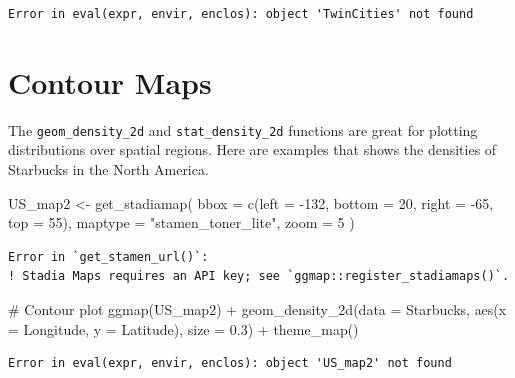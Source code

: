 \documentclass[
  letterpaper,
  DIV=11,
  numbers=noendperiod]{scrreprt}
\newenvironment{Shaded}{\begin{snugshade}}{\end{snugshade}}
\newcommand{\AttributeTok}[1]{\textcolor[rgb]{0.40,0.45,0.13}{#1}}
\newcommand{\CommentTok}[1]{\textcolor[rgb]{0.37,0.37,0.37}{#1}}
\newcommand{\DecValTok}[1]{\textcolor[rgb]{0.68,0.00,0.00}{#1}}
\newcommand{\FloatTok}[1]{\textcolor[rgb]{0.68,0.00,0.00}{#1}}
\newcommand{\FunctionTok}[1]{\textcolor[rgb]{0.28,0.35,0.67}{#1}}
\newcommand{\NormalTok}[1]{\textcolor[rgb]{0.00,0.23,0.31}{#1}}
\newcommand{\OtherTok}[1]{\textcolor[rgb]{0.00,0.23,0.31}{#1}}
\newcommand{\SpecialCharTok}[1]{\textcolor[rgb]{0.37,0.37,0.37}{#1}}
\newcommand{\StringTok}[1]{\textcolor[rgb]{0.13,0.47,0.30}{#1}}
\begin{document}
\begin{verbatim}
Error in eval(expr, envir, enclos): object 'TwinCities' not found
\end{verbatim}

\hfill\break

\section*{Contour Maps}\label{contour-maps}


The \texttt{geom\_density\_2d} and \texttt{stat\_density\_2d} functions
are great for plotting distributions over spatial regions. Here are
examples that shows the densities of Starbucks in the North America.

\begin{Shaded}
\begin{Highlighting}[]
\NormalTok{US\_map2 }\OtherTok{\textless{}{-}} \FunctionTok{get\_stadiamap}\NormalTok{(}
  \AttributeTok{bbox =} \FunctionTok{c}\NormalTok{(}\AttributeTok{left =} \SpecialCharTok{{-}}\DecValTok{132}\NormalTok{, }\AttributeTok{bottom =} \DecValTok{20}\NormalTok{, }\AttributeTok{right =} \SpecialCharTok{{-}}\DecValTok{65}\NormalTok{, }\AttributeTok{top =} \DecValTok{55}\NormalTok{),}
  \AttributeTok{maptype =} \StringTok{"stamen\_toner\_lite"}\NormalTok{,}
  \AttributeTok{zoom =} \DecValTok{5}
\NormalTok{)}
\end{Highlighting}
\end{Shaded}

\begin{verbatim}
Error in `get_stamen_url()`:
! Stadia Maps requires an API key; see `ggmap::register_stadiamaps()`.
\end{verbatim}

\begin{Shaded}
\begin{Highlighting}[]
\CommentTok{\# Contour plot}
\FunctionTok{ggmap}\NormalTok{(US\_map2) }\SpecialCharTok{+}
  \FunctionTok{geom\_density\_2d}\NormalTok{(}\AttributeTok{data =}\NormalTok{ Starbucks, }\FunctionTok{aes}\NormalTok{(}\AttributeTok{x =}\NormalTok{ Longitude, }\AttributeTok{y =}\NormalTok{ Latitude), }\AttributeTok{size =} \FloatTok{0.3}\NormalTok{) }\SpecialCharTok{+} 
  \FunctionTok{theme\_map}\NormalTok{()}
\end{Highlighting}
\end{Shaded}

\begin{verbatim}
Error in eval(expr, envir, enclos): object 'US_map2' not found
\end{verbatim}
\end{document}
